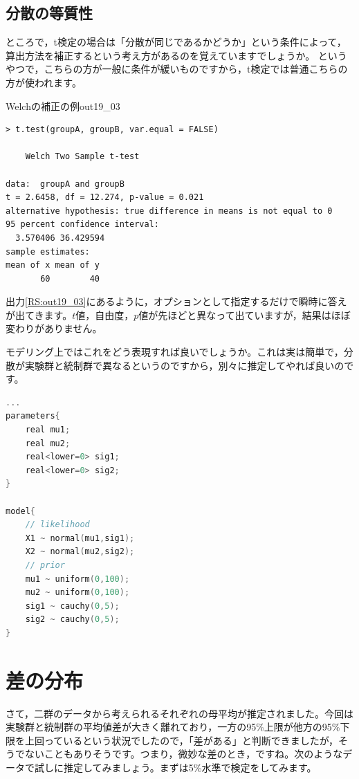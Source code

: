 \documentclass{ltjsbook}
\begin{document}
\subsection{分散の等質性}
ところで，t検定の場合は「分散が同じであるかどうか」という条件によって，算出方法を補正するという考え方があるのを覚えていますでしょうか。
というやつで，こちらの方が一般に条件が緩いものですから，t検定では普通こちらの方が使われます。
\begin{Rscreen}{Welchの補正の例}{out19_03}
	\begin{verbatim}
> t.test(groupA, groupB, var.equal = FALSE)

	Welch Two Sample t-test

data:  groupA and groupB
t = 2.6458, df = 12.274, p-value = 0.021
alternative hypothesis: true difference in means is not equal to 0
95 percent confidence interval:
  3.570406 36.429594
sample estimates:
mean of x mean of y 
       60        40 
    \end{verbatim}
\end{Rscreen}
出力\ref{RS:out19_03}にあるように，オプションとして指定するだけで瞬時に答えが出てきます。$t$値，自由度，$p$値が先ほどと異なって出ていますが，結果はほぼ変わりがありません。

モデリング上ではこれをどう表現すれば良いでしょうか。これは実は簡単で，分散が実験群と統制群で異なるというのですから，別々に推定してやれば良いのです。

\begin{lstlisting}[language=C++,label={code:19_04},caption={分散が異なる場合の推定モデル}]
        ...
parameters{
    real mu1;
    real mu2;
    real<lower=0> sig1;
    real<lower=0> sig2;
}

model{
    // likelihood
    X1 ~ normal(mu1,sig1);
    X2 ~ normal(mu2,sig2);
    // prior
    mu1 ~ uniform(0,100);
    mu2 ~ uniform(0,100);
    sig1 ~ cauchy(0,5);
    sig2 ~ cauchy(0,5);
}
\end{lstlisting}

\section{差の分布}
\label{ROPE}
さて，二群のデータから考えられるそれぞれの母平均が推定されました。今回は実験群と統制群の平均値差が大きく離れており，一方の95\%上限が他方の95\%下限を上回っているという状況でしたので，「差がある」と判断できましたが，そうでないこともありそうです。つまり，微妙な差のとき，ですね。次のようなデータで試しに推定してみましょう。まずは5\%水準で検定をしてみます。
\end{document}
